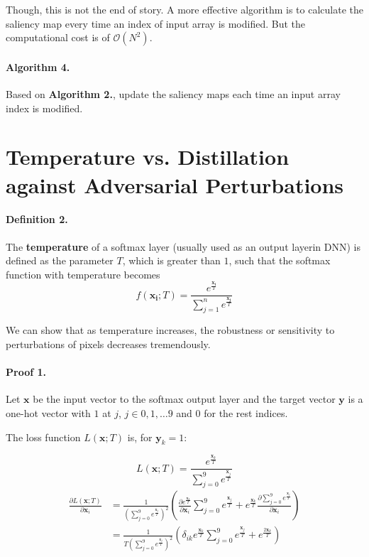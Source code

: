\documentclass{article}
\begin{document}
Though, this is not the end of story. A more effective algorithm is to calculate the saliency map every time an index of input array is modified. But the computational cost is of $\mathcal{O}(N^2)$.
\paragraph{Algorithm 4.}
Based on \textbf{Algorithm 2.}, update the saliency maps each time an input array index is modified.
\section{Temperature vs. Distillation against Adversarial Perturbations}

\paragraph{Definition 2.}
The \textbf{temperature} of a softmax layer (usually used as an output layerin DNN) is defined as the parameter $T$, which is greater than $1$, such that the softmax function with temperature becomes 
\begin{equation}
	f(\mathbf{x_i};T)=\frac{e^{\frac{\mathbf{x_i}}{T}}}{\sum_{j=1}^n 
	e^{\frac{\mathbf{x_j}}{T}}}
\end{equation}

We can show that as temperature increases, the robustness or sensitivity to perturbations of pixels decreases tremendously.

\paragraph{Proof 1.}
Let $\mathbf{x}$ be the input vector to the softmax output layer and the target vector $\mathbf{y}$ is a one-hot vector with $1$ at $j$, $j\in{0,1,\dots 9}$ and $0$ for the rest indices.

The loss function $L(\mathbf{x};T)$ is, for $\mathbf{y}_k=1$:

\begin{equation}
	L(\mathbf{x};T) = \frac{e^{\frac{\mathbf{x}_k}{T}}}{\sum_{j=0}^9 e^{\frac{\mathbf{x}_j}{T}}}
\end{equation}
\begin{align*}
	\frac{\partial L(\mathbf{x};T)}{\partial \mathbf{x}_i} &= 
	\frac{1}{(\sum_{j=0}^9 e^{\frac{\mathbf{x}_j}{T}})^2}
	(
	\frac{\partial e^{\frac{\mathbf{x}_k}{T}}}{\partial \mathbf{x}_i}
	\sum_{j=0}^9 e^{\frac{\mathbf{x}_j}{T}} 
	+ e^{\frac{\mathbf{x}_k}{T}}
	\frac{\partial \sum_{j=0}^9 e^{\frac{\mathbf{x}_j}{T}}}{\partial \mathbf{x}_i}
	)\\
	&=
	\frac{1}{T(\sum_{j=0}^9 e^{\frac{\mathbf{x}_j}{T}})^2} (
	\delta_{ik} e^{\frac{\mathbf{x}_k}{T}}
	\sum_{j=0}^9 e^{\frac{\mathbf{x}_j}{T}}+
	e^{\frac{2\mathbf{x}_k}{T}} )\\
\end{align*}
\end{document}
